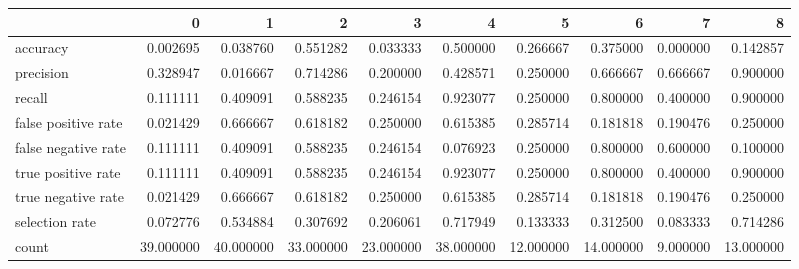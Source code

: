 \begin{tabular}{lrrrrrrrrr}
\toprule
{} &          0 &          1 &          2 &          3 &          4 &          5 &          6 &         7 &          8 \\
\midrule
accuracy            &   0.002695 &   0.038760 &   0.551282 &   0.033333 &   0.500000 &   0.266667 &   0.375000 &  0.000000 &   0.142857 \\
precision           &   0.328947 &   0.016667 &   0.714286 &   0.200000 &   0.428571 &   0.250000 &   0.666667 &  0.666667 &   0.900000 \\
recall              &   0.111111 &   0.409091 &   0.588235 &   0.246154 &   0.923077 &   0.250000 &   0.800000 &  0.400000 &   0.900000 \\
false positive rate &   0.021429 &   0.666667 &   0.618182 &   0.250000 &   0.615385 &   0.285714 &   0.181818 &  0.190476 &   0.250000 \\
false negative rate &   0.111111 &   0.409091 &   0.588235 &   0.246154 &   0.076923 &   0.250000 &   0.800000 &  0.600000 &   0.100000 \\
true positive rate  &   0.111111 &   0.409091 &   0.588235 &   0.246154 &   0.923077 &   0.250000 &   0.800000 &  0.400000 &   0.900000 \\
true negative rate  &   0.021429 &   0.666667 &   0.618182 &   0.250000 &   0.615385 &   0.285714 &   0.181818 &  0.190476 &   0.250000 \\
selection rate      &   0.072776 &   0.534884 &   0.307692 &   0.206061 &   0.717949 &   0.133333 &   0.312500 &  0.083333 &   0.714286 \\
count               &  39.000000 &  40.000000 &  33.000000 &  23.000000 &  38.000000 &  12.000000 &  14.000000 &  9.000000 &  13.000000 \\
\bottomrule
\end{tabular}
